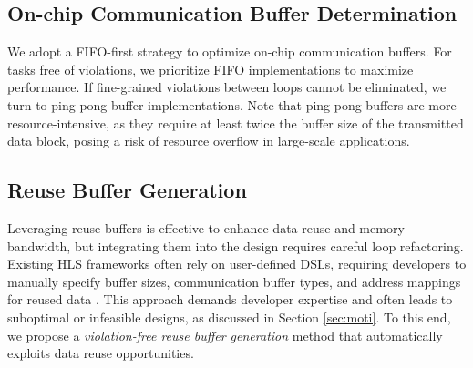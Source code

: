 \documentclass[conference]{IEEEtran}
\begin{document}
\subsection{On-chip Communication Buffer Determination} \label{sec:dataflow_select}
We adopt a FIFO-first strategy to optimize on-chip communication buffers. For tasks free of violations, we prioritize FIFO implementations to maximize performance. 
If fine-grained violations between loops cannot be eliminated, we turn to ping-pong buffer implementations. 
Note that ping-pong buffers are more resource-intensive, as they require at least twice the buffer size of the transmitted data block, posing a risk of resource overflow in large-scale applications. 

\subsection{Reuse Buffer Generation}\label{Reuse Buffer Generation}
\label{sec:reuse}
Leveraging reuse buffers is effective to enhance data reuse and memory bandwidth, but integrating them into the design requires careful loop refactoring.
Existing HLS frameworks often rely on user-defined DSLs, requiring developers to manually specify buffer sizes, communication buffer types, and address mappings for reused data \cite{lai2019heterocl, xiang2022heteroflow, chen2024allo}. This approach demands developer expertise
and often leads to suboptimal or infeasible designs,
as discussed in Section \ref{sec:moti}. 
To this end,
we propose a \textit{violation-free reuse buffer generation} method that automatically exploits data reuse opportunities.
\end{document}
